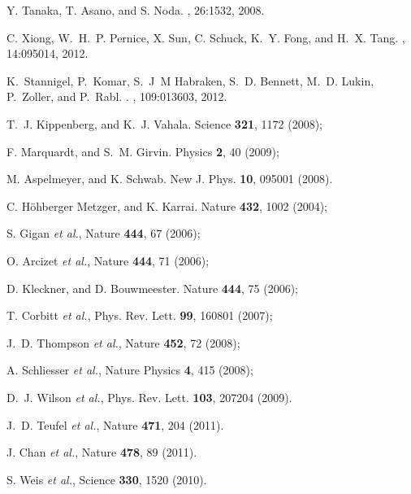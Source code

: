 \begin{thebibliography}{1}
Y. Tanaka,
T. Asano,
and S. Noda.
,
26:1532, 2008.

C. Xiong,
W.~H.~P. Pernice,
X. Sun,
C. Schuck,
K.~Y. Fong,
and H.~X. Tang.
, 
14:095014, 2012.

K.~Stannigel, 
P.~Komar, 
S.~J~M Habraken, 
S.~D. Bennett, 
M.~D. Lukin, 
P.~Zoller,
and P.~Rabl.
.
, 
109:013603, 2012.

T.~J. Kippenberg, 
and K.~J. Vahala. 
Science {\bf 321}, 1172 (2008); 

F. Marquardt, 
and S.~M. Girvin.
Physics {\bf 2}, 40 (2009); 

M. Aspelmeyer, 
and K. Schwab. 
New J. Phys. {\bf 10}, 095001 (2008).


C. H\"{o}hberger Metzger, 
and K. Karrai.
Nature {\bf 432}, 1002 (2004);

S. Gigan {\it et al.}, 
Nature {\bf 444}, 67 (2006);

O. Arcizet {\it et al.},  
Nature {\bf 444}, 71 (2006);

D. Kleckner, 
and D. Bouwmeester. 
Nature {\bf 444}, 75 (2006);

T. Corbitt {\it et al.}, 
Phys. Rev. Lett. {\bf 99}, 160801 (2007);

J.~D. Thompson {\it et al.}, 
Nature {\bf 452}, 72 (2008);

A. Schliesser {\it et al.}, 
Nature Physics  {\bf 4}, 415 (2008);

D.~J. Wilson {\it et al.}, 
Phys. Rev. Lett. \textbf{103}, 207204 (2009). 


J.~D. Teufel {\it et al.}, 
Nature {\bf 471}, 204 (2011).  

J. Chan {\it et al.}, 
Nature {\bf 478}, 89 (2011).  

S. Weis {\it et al.},   
Science {\bf 330}, 1520 (2010).


\end{thebibliography}
